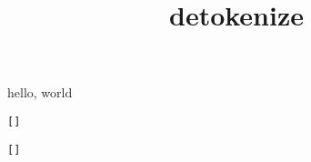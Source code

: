 \documentclass{amsart}
\title{detokenize}
\begin{document}
\maketitle

hello, world

\texttt{}

\texttt{\detokenize{\fafkl {} $_&^}}

\texttt{[]}

\texttt{[\detokenize{\A\B\C}]}

\edef\X{\detokenize{\fafkl {} $_&^}}

{\tt\meaning\X}
\end{document}
